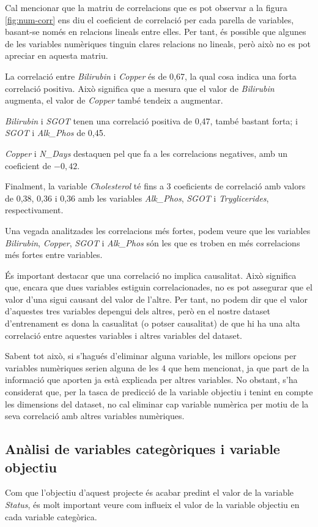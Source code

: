 Cal mencionar que la matriu de correlacions que es pot observar a la figura \ref{fig:num-corr} ens diu el coeficient de correlació per cada parella de variables, basant-se només en relacions lineals entre elles. Per tant, és possible que algunes de les variables numèriques tinguin clares relacions no lineals, però això no es pot apreciar en aquesta matriu.

La correlació entre \textit{Bilirubin} i \textit{Copper} és de 0,67, la qual cosa indica una forta correlació positiva. Això significa que a mesura que el valor de \textit{Bilirubin} augmenta, el valor de \textit{Copper} també tendeix a augmentar. 

\textit{Bilirubin} i \textit{SGOT} tenen una correlació positiva de 0,47, també bastant forta; i \textit{SGOT} i \textit{Alk\_Phos} de 0,45.

\textit{Copper} i \textit{N\_Days} destaquen pel que fa a les correlacions negatives, amb un coeficient de $-0,42$.

Finalment, la variable \textit{Cholesterol} té fins a 3 coeficients de correlació amb valors de 0,38, 0,36 i 0,36 amb les variables \textit{Alk\_Phos}, \textit{SGOT} i \textit{Tryglicerides}, respectivament.

Una vegada analitzades les correlacions més fortes, podem veure que les variables \textit{Bilirubin}, \textit{Copper}, \textit{SGOT} i \textit{Alk\_Phos} són les que es troben en més correlacions més fortes entre variables.

És important destacar que una correlació no implica causalitat. Això significa que, encara que dues variables estiguin correlacionades, no es pot assegurar que el valor d'una sigui causant del valor de l'altre. Per tant, no podem dir que el valor d'aquestes tres variables depengui dels altres, però en el nostre dataset d'entrenament es dona la casualitat (o potser causalitat) de que hi ha una alta correlació entre aquestes variables i altres variables del dataset.

Sabent tot això, si s'hagués d'eliminar alguna variable, les millors opcions per variables numèriques serien alguna de les 4 que hem mencionat, ja que part de la informació que aporten ja està explicada per altres variables. No obstant, s'ha considerat que, per la tasca de predicció de la variable objectiu i tenint en compte les dimensions del dataset, no cal eliminar cap variable numèrica per motiu de la seva correlació amb altres variables numèriques.

\subsection{Anàlisi de variables categòriques i variable objectiu}
Com que l'objectiu d'aquest projecte és acabar predint el valor de la variable \textit{Status}, és molt important veure com influeix el valor de la variable objectiu en cada variable categòrica.


